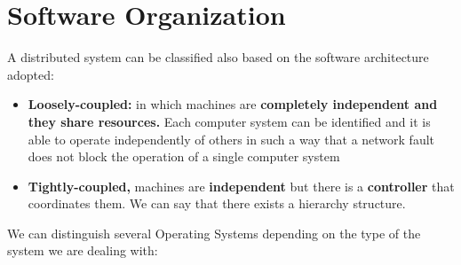 \section{Software Organization}
A distributed system can be classified also based on the software architecture adopted:
\begin{itemize}
    \item \textbf{Loosely-coupled:} in which machines are \textbf{completely independent and they share resources.} Each computer system can be identified and it is able to operate independently of others in such a way that a network fault does not block the operation of a single computer system
    \item \textbf{Tightly-coupled,} machines are \textbf{independent} but there is a \textbf{controller} that coordinates them. We can say that there exists a hierarchy structure.
\end{itemize}
We can distinguish several Operating Systems depending on the type of the system we are dealing with:
